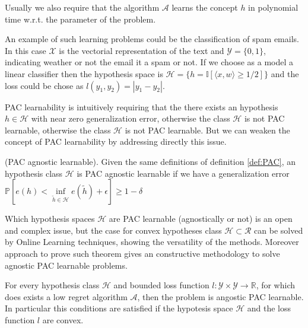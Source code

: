 Usually we also require that the algorithm $\mathcal A$ learns the concept $h$ in polynomial time w.r.t. the parameter of the problem. 

An example of such learning problems could be the classification of spam emails. In this case $\mathcal X$ is the vectorial representation of the text and $\mathcal Y=\{0,1\}$, indicating weather or not the email it a spam or not. If we choose as a model a linear classifier then the hypothesis space is $\mathcal H=\{h = \mathbb I[\langle x,w\rangle \ge 1/2]\}$ and the loss could be chose as $l(y_1,y_2)=|y_1-y_2|$.

PAC learnability is intuitively requiring that the there exists an hypothesis $h\in\mathcal H$ with near zero generalization error, otherwise the class $\mathcal H$ is not PAC learnable, otherwise the class $\mathcal H$ is not PAC learnable.
But we can weaken the concept of PAC learnability by addressing directly this issue.

\begin{definition}(PAC agnostic learnable).
    Given the same definitions of definition \ref{def:PAC}, an hypothesis class $\mathcal H$ is PAC agnostic learnable if we have a generalization error $\mathbb P[e(h)<\inf\limits_{\tilde h\in\mathcal H}e(\tilde h)+\epsilon]\ge1-\delta$
\end{definition}

Which hypothesis spaces $\mathcal H$ are PAC learnable (agnostically or not) is an open and complex issue, but the case for convex hypotheses class $\mathcal H\subset\mathcal R$ can be solved by Online Learning techniques, showing the versatility of the methods. 
Moreover approach to prove such theorem gives an constructive methodology to solve agnostic PAC learnable problems.

\begin{theorem}
For every hypothesis class $\mathcal H$ and bounded loss function $l:\mathcal Y\times\mathcal Y\to \mathbb R$, for which does exists a low regret algorithm $\mathcal A$, then the problem is angostic PAC learnable. In particular this conditions are satisfied if the hypotesis space $\mathcal H$ and the loss function $l$ are convex.
\end{theorem}

